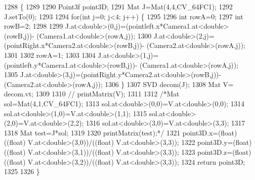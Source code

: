 \begin{DoxyCode}
1288                                                                                                      \{
1289 
1290       Point3f point3D;
1291       Mat J=Mat(4,4,CV\_64FC1);
1292       J.setTo(0);
1293                 
1294       \textcolor{keywordflow}{for}(\textcolor{keywordtype}{int} j=0; j<4; j++) \{
1295 
1296             \textcolor{keywordtype}{int} rowA=0;
1297             \textcolor{keywordtype}{int} rowB=2;
1298 
1299             J.at<\textcolor{keywordtype}{double}>(0,j)=(pointleft.x*Camera1.at<\textcolor{keywordtype}{double}>(rowB,j))- (Camera1.at<\textcolor{keywordtype}{double}>(rowA,j));
1300             J.at<\textcolor{keywordtype}{double}>(2,j)=(pointRight.x*Camera2.at<\textcolor{keywordtype}{double}>(rowB,j))- (Camera2.at<\textcolor{keywordtype}{double}>(rowA,j));
1301 
1302             rowA=1;
1303             
1304             J.at<\textcolor{keywordtype}{double}>(1,j)=(pointleft.y*Camera1.at<\textcolor{keywordtype}{double}>(rowB,j))- (Camera1.at<\textcolor{keywordtype}{double}>(rowA,j));
1305             J.at<\textcolor{keywordtype}{double}>(3,j)=(pointRight.y*Camera2.at<\textcolor{keywordtype}{double}>(rowB,j))- (Camera2.at<\textcolor{keywordtype}{double}>(rowA,j));
1306         \}
1307         SVD decom(J);
1308         Mat V= decom.vt;
1309 
1310        \textcolor{comment}{// printMatrix(V);}
1311         
1312         \textcolor{comment}{/*Mat sol=Mat(4,1,CV\_64FC1);}
1313 \textcolor{comment}{        sol.at<double>(0,0)=V.at<double>(0,0);}
1314 \textcolor{comment}{        sol.at<double>(1,0)=V.at<double>(1,1);}
1315 \textcolor{comment}{        sol.at<double>(2,0)=V.at<double>(2,2);}
1316 \textcolor{comment}{        sol.at<double>(3,0)=V.at<double>(3,3);}
1317 \textcolor{comment}{        }
1318 \textcolor{comment}{        Mat test=J*sol;}
1319 \textcolor{comment}{        }
1320 \textcolor{comment}{        printMatrix(test);*/}
1321         point3D.x=(float) ((\textcolor{keywordtype}{float}) V.at<\textcolor{keywordtype}{double}>(3,0))/((float) V.at<\textcolor{keywordtype}{double}>(3,3));
1322         point3D.y=(float) ((\textcolor{keywordtype}{float}) V.at<\textcolor{keywordtype}{double}>(3,1))/((float) V.at<\textcolor{keywordtype}{double}>(3,3));     
1323         point3D.z=(float) ((\textcolor{keywordtype}{float}) V.at<\textcolor{keywordtype}{double}>(3,2))/((float) V.at<\textcolor{keywordtype}{double}>(3,3));
1324         \textcolor{keywordflow}{return} point3D;
1325 
1326 \}
\end{DoxyCode}
